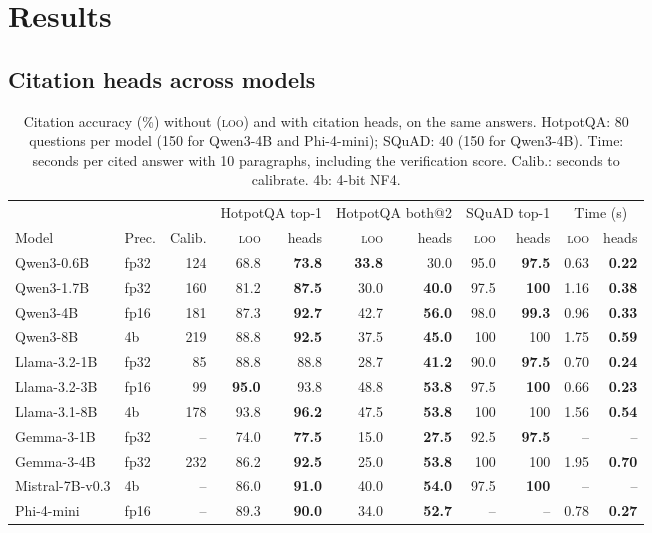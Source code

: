 \documentclass[11pt]{article}
\newcommand{\best}[1]{\textbf{#1}}
\newcommand{\loo}{\textsc{loo}}
\begin{document}
\section{Results}
\label{sec:results}

\subsection{Citation heads across models}

\begin{table}[t]
\centering
\small
\caption{Citation accuracy (\%) without (\loo) and with citation heads, on the same answers. HotpotQA: 80 questions per model (150 for Qwen3-4B and Phi-4-mini); SQuAD: 40 (150 for Qwen3-4B). Time: seconds per cited answer with 10 paragraphs, including the verification score. Calib.: seconds to calibrate. 4b: 4-bit NF4.}
\label{tab:models}
\setlength{\tabcolsep}{4.5pt}
\begin{tabular}{llrrrrrrrrr}
\toprule
& & & \multicolumn{2}{c}{HotpotQA top-1} & \multicolumn{2}{c}{HotpotQA both@2} & \multicolumn{2}{c}{SQuAD top-1} & \multicolumn{2}{c}{Time (s)} \\
\cmidrule(lr){4-5}\cmidrule(lr){6-7}\cmidrule(lr){8-9}\cmidrule(lr){10-11}
Model & Prec. & Calib. & \loo & heads & \loo & heads & \loo & heads & \loo & heads \\
\midrule
Qwen3-0.6B & fp32 & 124 & 68.8 & \best{73.8} & \best{33.8} & 30.0 & 95.0 & \best{97.5} & 0.63 & \best{0.22} \\
Qwen3-1.7B & fp32 & 160 & 81.2 & \best{87.5} & 30.0 & \best{40.0} & 97.5 & \best{100} & 1.16 & \best{0.38} \\
Qwen3-4B & fp16 & 181 & 87.3 & \best{92.7} & 42.7 & \best{56.0} & 98.0 & \best{99.3} & 0.96 & \best{0.33} \\
Qwen3-8B & 4b & 219 & 88.8 & \best{92.5} & 37.5 & \best{45.0} & 100 & 100 & 1.75 & \best{0.59} \\
Llama-3.2-1B & fp32 & 85 & 88.8 & 88.8 & 28.7 & \best{41.2} & 90.0 & \best{97.5} & 0.70 & \best{0.24} \\
Llama-3.2-3B & fp16 & 99 & \best{95.0} & 93.8 & 48.8 & \best{53.8} & 97.5 & \best{100} & 0.66 & \best{0.23} \\
Llama-3.1-8B & 4b & 178 & 93.8 & \best{96.2} & 47.5 & \best{53.8} & 100 & 100 & 1.56 & \best{0.54} \\
Gemma-3-1B & fp32 & -- & 74.0 & \best{77.5} & 15.0 & \best{27.5} & 92.5 & \best{97.5} & -- & -- \\
Gemma-3-4B & fp32 & 232 & 86.2 & \best{92.5} & 25.0 & \best{53.8} & 100 & 100 & 1.95 & \best{0.70} \\
Mistral-7B-v0.3 & 4b & -- & 86.0 & \best{91.0} & 40.0 & \best{54.0} & 97.5 & \best{100} & -- & -- \\
Phi-4-mini & fp16 & -- & 89.3 & \best{90.0} & 34.0 & \best{52.7} & -- & -- & 0.78 & \best{0.27} \\
\bottomrule
\end{tabular}
\end{table}
\end{document}

